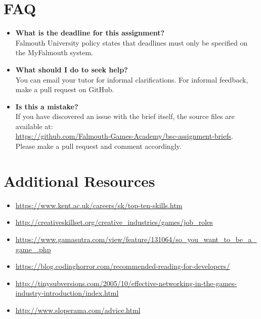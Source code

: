 \documentclass{../../fal_assignment}
\begin{document}
\section*{FAQ}

\begin{itemize}
	\item 	\textbf{What is the deadline for this assignment?} \\ 
    		Falmouth University policy states that deadlines must only be specified on the MyFalmouth system.
    		
	\item 	\textbf{What should I do to seek help?} \\ 
    		You can email your tutor for informal clarifications. For informal feedback, make a pull request on GitHub. 
    		
    	\item 	\textbf{Is this a mistake?} \\ 	
    		If you have discovered an issue with the brief itself, the source files are available at: \\
    		\url{https://github.com/Falmouth-Games-Academy/bsc-assignment-briefs}.\\
    		 Please make a pull request and comment accordingly.
\end{itemize}

\section*{Additional Resources}

\begin{itemize}
    \item \url{https://www.kent.ac.uk/careers/sk/top-ten-skills.htm}
    \item \url{http://creativeskillset.org/creative_industries/games/job_roles}
    \item \url{https://www.gamasutra.com/view/feature/131064/so_you_want_to_be_a_game_.php}
    \item \url{https://blog.codinghorror.com/recommended-reading-for-developers/}
    \item \url{http://tinysubversions.com/2005/10/effective-networking-in-the-games-industry-introduction/index.html}
    \item \url{http://www.sloperama.com/advice.html}
\end{itemize}

\rubricyearthree
\end{document}
